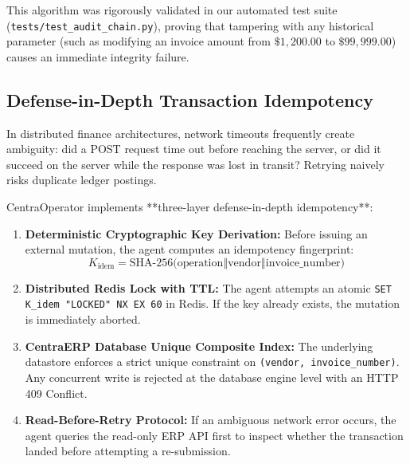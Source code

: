 This algorithm was rigorously validated in our automated test suite (\texttt{tests/test\_audit\_chain.py}), proving that tampering with any historical parameter (such as modifying an invoice amount from $\$1,200.00$ to $\$99,999.00$) causes an immediate integrity failure.

\subsection{Defense-in-Depth Transaction Idempotency}
In distributed finance architectures, network timeouts frequently create ambiguity: did a POST request time out before reaching the server, or did it succeed on the server while the response was lost in transit? Retrying naively risks duplicate ledger postings.

CentraOperator implements **three-layer defense-in-depth idempotency**:

\begin{enumerate}[leftmargin=*]
  \item \textbf{Deterministic Cryptographic Key Derivation:} Before issuing an external mutation, the agent computes an idempotency fingerprint:
  \begin{equation}
    K_{\text{idem}} = \text{SHA-256}\big(\text{operation} \mathbin{\Vert} \text{vendor} \mathbin{\Vert} \text{invoice\_number}\big)
  \end{equation}
  \item \textbf{Distributed Redis Lock with TTL:} The agent attempts an atomic \texttt{SET K\_idem "LOCKED" NX EX 60} in Redis. If the key already exists, the mutation is immediately aborted.
  \item \textbf{CentraERP Database Unique Composite Index:} The underlying datastore enforces a strict unique constraint on \texttt{(vendor, invoice\_number)}. Any concurrent write is rejected at the database engine level with an HTTP 409 Conflict.
  \item \textbf{Read-Before-Retry Protocol:} If an ambiguous network error occurs, the agent queries the read-only ERP API first to inspect whether the transaction landed before attempting a re-submission.
\end{enumerate}
